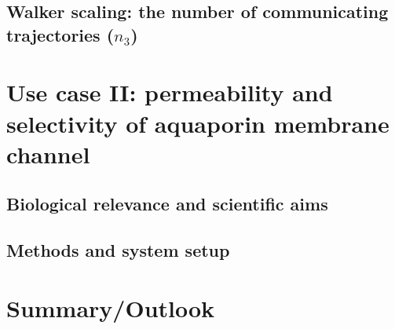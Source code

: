 \documentclass[11pt,a4paper]{article}
\begin{document}
\subsection{Walker scaling: the number of communicating trajectories ($n_3$)}




\section{Use case II: permeability and selectivity of aquaporin membrane channel}
\subsection{Biological relevance and scientific aims}
\cite{lindahl2018permeability}
\subsection{Methods and system setup}

\section{Summary/Outlook}


\end{document}

